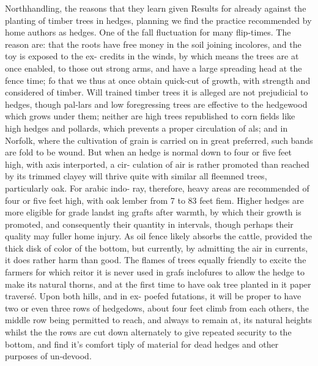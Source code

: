 \documentclass{article}
\begin{document}
Northhandling, the reasons that they learn given Results for already against the planting of timber trees in hedges, planning we find the practice recommended by home authors as hedges. One of the fall fluctuation for many flip-times. The reason are: that the roots have free money in the soil joining incolores, and the toy is exposed to the ex- credits in the winds, by which means the trees are at once enabled, to those out strong arms, and have a large spreading head at the fence time; fo that we thus at once obtain quick-cut of growth, with strength and considered of timber. Will trained timber trees it is alleged are not prejudicial to hedges, though pal-lars and low foregressing trees are effective to the hedgewood which grows under them; neither are high trees republished to corn fields like high hedges and pollards, which prevents a proper circulation of als; and in Norfolk, where the cultivation of grain is carried on in great preferred, such bands are fold to be wound. But when an hedge is normal down to four or five feet high, with axis interported, a cir- culation of air is rather promoted than reached by its trimmed clayey will thrive quite with similar all fleemned trees, particularly oak. For arabic indo- ray, therefore, heavy areas are recommended of four or five feet high, with oak lember from 7 to 83 feet fiem. Higher hedges are more eligible for grade landst ing grafts after warmth, by which their growth is promoted, and consequently their quantity in intervals, though perhaps their quality may fuller home injury. As oil fence likely absorbs the cattle, provided the thick disk of color of the bottom, but currently, by admitting the air in currents, it does rather harm than good. The flames of trees equally friendly to excite the farmers for which reitor it is never used in grafs inclofures to allow the hedge to make its natural thorns, and at the first time to have oak tree planted in it paper traversé. Upon both hills, and in ex- poefed futations, it will be proper to have two or even three rows of hedgedows, about four feet climb from each others, the middle row being permitted to reach, and always to remain at, its natural heights whilst the the rows are cut down alternately to give repeated security to the bottom, and find it's comfort tiply of material for dead hedges and other purposes of un-devood.
\end{document}
